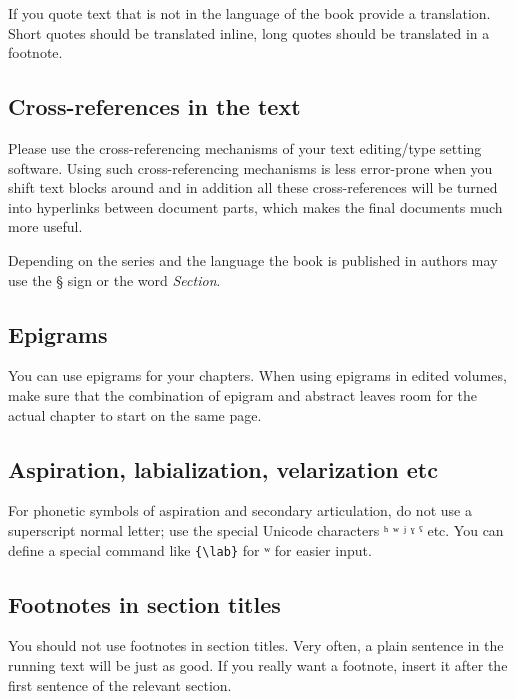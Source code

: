{If you quote text that is not in the language of the book provide a translation. Short quotes should
be translated inline, long quotes should be translated in a footnote.




\subsection{Cross-references in the text}

Please use the cross-referencing mechanisms of your text editing/type setting software. Using such
cross-referencing mechanisms is less error-prone when you shift text blocks around and in addition
all these cross-references will be turned into hyperlinks between document parts, which makes the
final documents much more useful.


 
Depending on the series and the language the book is published in authors may  use the § sign or the word \emph{Section}. 

\subsection{Epigrams}
You can use epigrams for your chapters. When using epigrams in edited volumes, make sure that the combination of epigram and abstract leaves room for the actual chapter to start on the same page.

\subsection{Aspiration, labialization, velarization etc}
For phonetic symbols of aspiration and secondary articulation, do not use a superscript normal letter; use the special Unicode characters ʰ ʷ ʲ ˠ ˤ etc. You can define a special command like \verb+{\lab}+ for ʷ for easier input. 

\subsection{Footnotes in section titles}
You should not use footnotes in section titles. Very often, a plain sentence in the running text will be just as good. If you really want a footnote, insert it after the first sentence of the relevant section.
}
